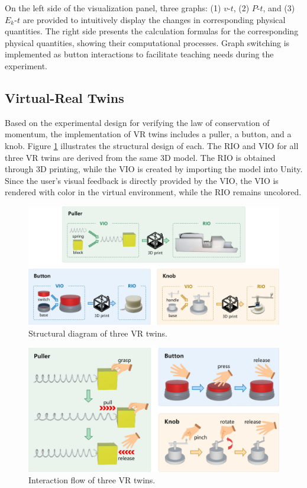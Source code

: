 \documentclass[runningheads]{llncs}
\begin{document}
On the left side of the visualization panel, three graphs: (1) $v$-$t$, (2) $P$-$t$, and (3) $E_k$-$t$ are provided to intuitively display the changes in corresponding physical quantities. The right side presents the calculation formulas for the corresponding physical quantities, showing their computational processes. Graph switching is implemented as button interactions to facilitate teaching needs during the experiment.

\subsection{Virtual-Real Twins}
Based on the experimental design for verifying the law of conservation of momentum, the implementation of VR twins includes a puller, a button, and a knob. Figure \ref{fig:structural-diagram} illustrates the structural design of each. The RIO and VIO for all three VR twins are derived from the same 3D model. The RIO is obtained through 3D printing, while the VIO is created by importing the model into Unity. Since the user's visual feedback is directly provided by the VIO, the VIO is rendered with color in the virtual environment, while the RIO remains uncolored.

\begin{figure}[t]
  \centering
  \includegraphics[width=1\textwidth]{image/Structural-Diagram.pdf} %
  \caption{Structural diagram of three VR twins.}
  \label{fig:structural-diagram}
\end{figure}

\begin{figure}[t]
  \centering
  \includegraphics[width=1\textwidth]{image/Interaction-Flow.pdf}
  \caption{Interaction flow of three VR twins.}
  \label{fig:interaction-flow}
\end{figure}
\end{document}
